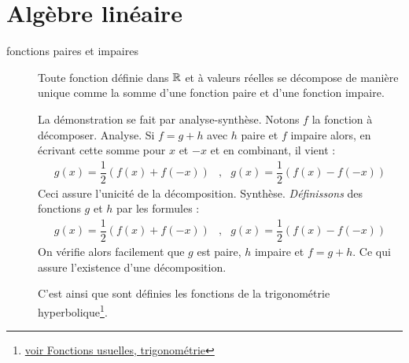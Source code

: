 \section{Algèbre linéaire}
\begin{description}
 \item[fonctions paires et impaires]
\begin{prop}
 Toute fonction définie dans $\mathbb{R}$ et à valeurs réelles se décompose de manière unique comme la somme d'une fonction paire et d'une fonction impaire.
\end{prop}
\begin{demo}
 La démonstration se fait par analyse-synthèse. Notons $f$ la fonction à décomposer.\newline
Analyse. Si $f=g+h$ avec $h$ paire et $f$ impaire alors, en écrivant cette somme pour $x$ et $-x$ et en combinant, il vient :
\begin{align*}
 g(x)=\dfrac{1}{2}(f(x)+f(-x)) &,& g(x)=\dfrac{1}{2}(f(x)-f(-x))
\end{align*}
Ceci assure l'unicité de la décomposition.\newline
Synthèse. \emph{Définissons} des fonctions $g$ et $h$ par les formules :
\begin{align*}
 g(x)=\dfrac{1}{2}(f(x)+f(-x)) &,& g(x)=\dfrac{1}{2}(f(x)-f(-x))
\end{align*}
On vérifie alors facilement que $g$ est paire, $h$ impaire et $f=g+h$. Ce qui assure l'existence d'une décomposition. 
\end{demo}
\begin{rem}
 C'est ainsi que sont définies les fonctions de la trigonométrie hyperbolique\footnote{\href{\baseurl C2004.pdf}{voir Fonctions usuelles, trigonométrie}}. 
\end{rem}


\end{description}
